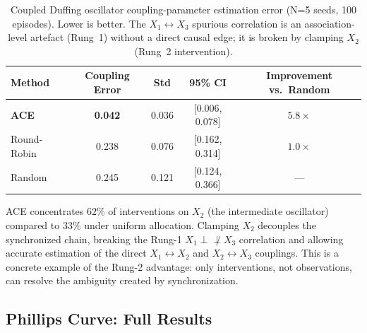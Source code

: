 \begin{table}[h]
\centering
\caption{Coupled Duffing oscillator coupling-parameter estimation error (N=5 seeds, 100 episodes). Lower is better. The $X_1 \leftrightarrow X_3$ spurious correlation is an association-level artefact (Rung~1) without a direct causal edge; it is broken by clamping $X_2$ (Rung~2 intervention).}
\label{tab:duffing-full}
\small
\begin{tabular}{@{}lcccc@{}}
\toprule
Method & Coupling Error & Std & 95\% CI & Improvement vs.\ Random \\
\midrule
\textbf{ACE} & \textbf{0.042} & 0.036 & [0.006, 0.078] & $5.8\times$ \\
Round-Robin  & 0.238 & 0.076 & [0.162, 0.314] & $1.0\times$ \\
Random       & 0.245 & 0.121 & [0.124, 0.366] & --- \\
\bottomrule
\end{tabular}
\end{table}

ACE concentrates $62\%$ of interventions on $X_2$ (the intermediate oscillator) compared to $33\%$ under uniform allocation. Clamping $X_2$ decouples the synchronized chain, breaking the Rung-1 $X_1 \perp\!\!\!\!\not\perp X_3$ correlation and allowing accurate estimation of the direct $X_1 \leftrightarrow X_2$ and $X_2 \leftrightarrow X_3$ couplings. This is a concrete example of the Rung-2 advantage: only interventions, not observations, can resolve the ambiguity created by synchronization.

\subsection{Phillips Curve: Full Results}
\label{app:phillips}

